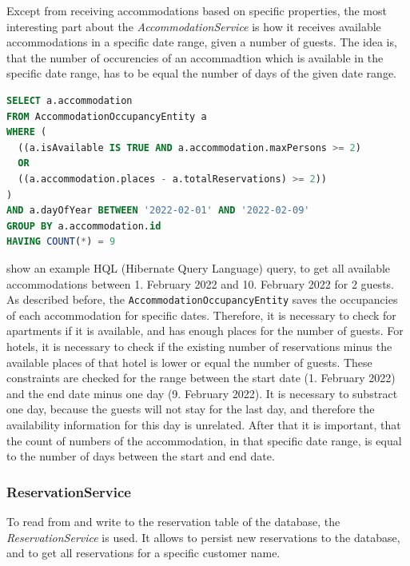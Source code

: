 Except from receiving accommodations based on specific properties, the most interesting part about the \textit{AccommodationService} is how it receives available accommodations in a specific date range, given a number of guests.
The idea is, that the number of occurencies of an accommadtion which is available in the specific date range, has to be equal the number of days of the given date range.
\begin{lstlisting}[label=lst:02_design_ejb_accommodation_sql, caption=Example of a HQL query to receive all available accommodations, language=sql]
SELECT a.accommodation
FROM AccommodationOccupancyEntity a
WHERE (
  ((a.isAvailable IS TRUE AND a.accommodation.maxPersons >= 2) 
  OR 
  ((a.accommodation.places - a.totalReservations) >= 2))
)
AND a.dayOfYear BETWEEN '2022-02-01' AND '2022-02-09'
GROUP BY a.accommodation.id
HAVING COUNT(*) = 9 
\end{lstlisting}
 show an example HQL (Hibernate Query Language) query, to get all available accommodations between 1. February 2022 and 10. February 2022 for 2 guests.
As described before, the \texttt{AccommodationOccupancyEntity} saves the occupancies of each accommodation for specific dates. Therefore, it is necessary to check for apartments if it is available, and has enough places for the number of guests. For hotels, it is necessary to check if the existing number of reservations minus the available places of that hotel is lower or equal the number of guests.
These constraints are checked for the range between the start date (1. February 2022) and the end date minus one day (9. February 2022). It is necessary to substract one day, because the guests will not stay for the last day, and therefore the availability information for this day is unrelated.
After that it is important, that the count of numbers of the accommodation, in that specific date range, is equal to the number of days between the start and end date.


\subsubsection{ReservationService}\label{sec:02_design_beans_reservation}
To read from and write to the reservation table of the database, the \textit{ReservationService} is used. It allows to persist new reservations to the database, and to get all reservations for a specific customer name.

